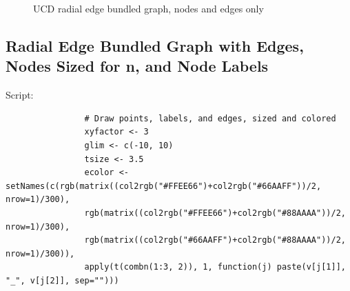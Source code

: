 \documentclass[10pt, letterpaper]{article}
\begin{document}
\begin{spacing}{1.0}
\begin{figure}[H]
    \centering
    \caption{UCD radial edge bundled graph, nodes and edges only}
    \label{fg:edgebund1}
\end{figure}

\subsection{Radial Edge Bundled Graph with Edges, Nodes Sized for n, and Node Labels}

Script:
\small
\begin{verbatim}
                # Draw points, labels, and edges, sized and colored
                xyfactor <- 3
                glim <- c(-10, 10)
                tsize <- 3.5
                ecolor <- setNames(c(rgb(matrix((col2rgb("#FFEE66")+col2rgb("#66AAFF"))/2, nrow=1)/300),
                rgb(matrix((col2rgb("#FFEE66")+col2rgb("#88AAAA"))/2, nrow=1)/300),
                rgb(matrix((col2rgb("#66AAFF")+col2rgb("#88AAAA"))/2, nrow=1)/300)),
                apply(t(combn(1:3, 2)), 1, function(j) paste(v[j[1]], "_", v[j[2]], sep="")))
               

\end{verbatim}
\end{spacing}
\end{document}
